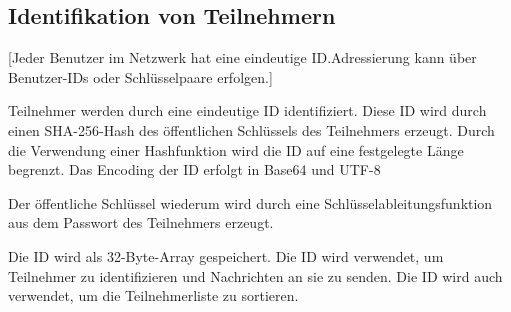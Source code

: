 \subsection{Identifikation von Teilnehmern}
\label{subsec:identifikation_von_teilnehmern}

[Jeder Benutzer im Netzwerk hat eine eindeutige ID.Adressierung kann über 
Benutzer-IDs oder Schlüsselpaare erfolgen.]

\noindent Teilnehmer werden durch eine eindeutige ID identifiziert. Diese ID wird
durch einen SHA-256-Hash des öffentlichen Schlüssels des Teilnehmers
erzeugt. Durch die Verwendung einer Hashfunktion wird die ID auf eine
festgelegte Länge begrenzt. Das Encoding der ID erfolgt in Base64 und UTF-8


Der öffentliche Schlüssel wiederum wird durch eine Schlüsselableitungsfunktion
aus dem Passwort des Teilnehmers erzeugt.



Die ID wird als 32-Byte-Array
gespeichert. Die ID wird verwendet, um Teilnehmer zu identifizieren und
Nachrichten an sie zu senden. Die ID wird auch verwendet, um die
Teilnehmerliste zu sortieren.